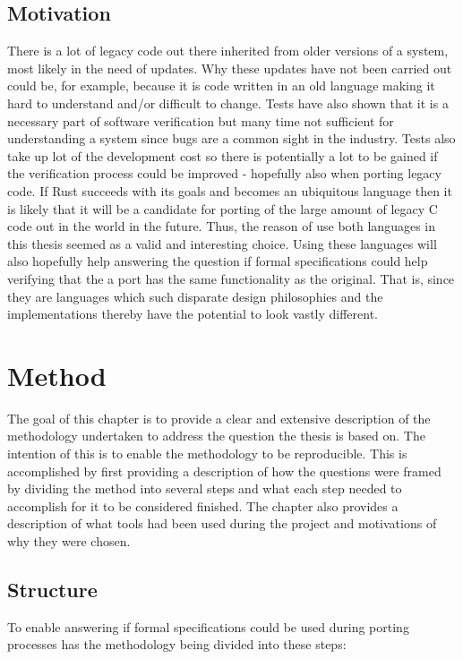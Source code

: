 \documentclass{article}
\begin{document}
\subsection{Motivation}\label{motivation}

There is a lot of legacy code out there inherited from older versions of a system, most likely in the need of updates. Why these updates have not been carried out could be, for example, because it is code written in an old language making it hard to understand and/or difficult to change. Tests have also shown that it is a necessary part of software verification but many time not sufficient for understanding a system since bugs are a common sight in the industry. Tests also take up lot of the development cost so there is potentially a lot to be gained if the verification process could be improved - hopefully also when porting legacy code. If Rust succeeds with its goals and becomes an ubiquitous language then it is likely that it will be a candidate for porting of the large amount of legacy C code out in the world in the future. Thus, the reason of use both languages in this thesis seemed as a valid and interesting choice. Using these languages will also hopefully help answering the question if formal specifications could help verifying that the a port has the same functionality as the original. That is, since they are languages which such disparate design philosophies and the implementations thereby have the potential to look vastly different.

\section{Method}\label{method}
The goal of this chapter is to provide a clear and extensive description of the methodology undertaken to address the question the thesis is based on. The intention of this is to enable the methodology to be reproducible. This is accomplished by first providing a description of how the questions were framed by dividing the method into several steps and what each step needed to accomplish for it to be considered finished. The chapter also provides a description of what tools had been used during the project and motivations of why they were chosen.
 
\subsection{Structure}\label{structure}

To enable answering if formal specifications could be used during porting processes has the methodology being divided into these steps: 
\end{document}
